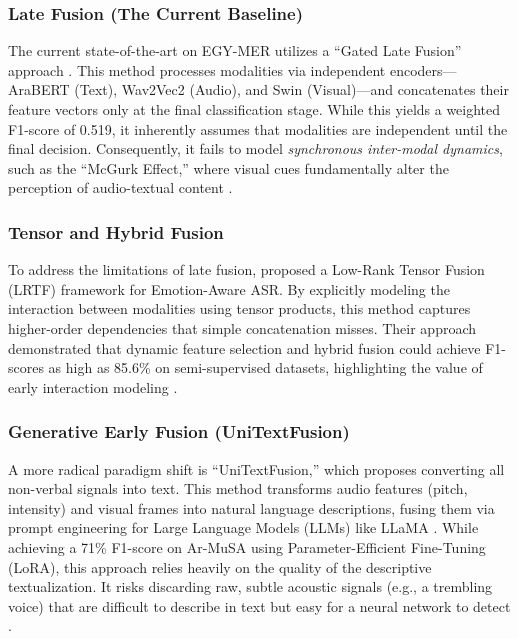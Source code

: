 \documentclass[12pt, a4paper]{article}
\begin{document}
\subsubsection{Late Fusion (The Current Baseline)}
The current state-of-the-art on EGY-MER utilizes a ``Gated Late Fusion'' approach \citep{Hussein2025}. This method processes modalities via independent encoders---AraBERT (Text), Wav2Vec2 (Audio), and Swin (Visual)---and concatenates their feature vectors only at the final classification stage. While this yields a weighted F1-score of 0.519, it inherently assumes that modalities are independent until the final decision. Consequently, it fails to model \textit{synchronous inter-modal dynamics}, such as the ``McGurk Effect,'' where visual cues fundamentally alter the perception of audio-textual content \citep{Hussein2025}.

\subsubsection{Tensor and Hybrid Fusion}
To address the limitations of late fusion, \citet{Dabbabi2025} proposed a Low-Rank Tensor Fusion (LRTF) framework for Emotion-Aware ASR. By explicitly modeling the interaction between modalities using tensor products, this method captures higher-order dependencies that simple concatenation misses. Their approach demonstrated that dynamic feature selection and hybrid fusion could achieve F1-scores as high as 85.6\% on semi-supervised datasets, highlighting the value of early interaction modeling \citep{Dabbabi2025}.

\subsubsection{Generative Early Fusion (UniTextFusion)}
A more radical paradigm shift is ``UniTextFusion,'' which proposes converting all non-verbal signals into text. This method transforms audio features (pitch, intensity) and visual frames into natural language descriptions, fusing them via prompt engineering for Large Language Models (LLMs) like LLaMA \citep{KhaledUniText2025}. While achieving a 71\% F1-score on Ar-MuSA using Parameter-Efficient Fine-Tuning (LoRA), this approach relies heavily on the quality of the descriptive textualization. It risks discarding raw, subtle acoustic signals (e.g., a trembling voice) that are difficult to describe in text but easy for a neural network to detect \citep{KhaledUniText2025}.
\end{document}
